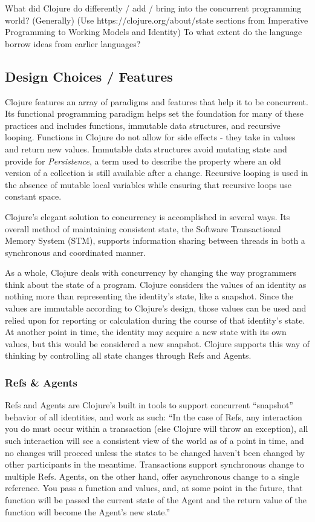     What did Clojure do differently / add / bring into the concurrent programming world? (Generally)
        (Use https://clojure.org/about/state sections from Imperative Programming to Working Models and Identity)
    To what extent do the language borrow ideas from earlier languages?
    
\subsection{Design Choices / Features}
    
   Clojure features an array of paradigms and features that help it to be concurrent. Its functional programming paradigm helps set the foundation for many of these practices and includes functions, immutable data structures, and recursive looping. Functions in Clojure do not allow for side effects - they take in values and return new values. Immutable data structures avoid mutating state and provide for \textit{Persistence}, a term used to describe the property where an old version of a collection is still available after a change. Recursive looping is used in the absence of mutable local variables while ensuring that recursive loops use constant space.
    
    Clojure's elegant solution to concurrency is accomplished in several ways. Its overall method of maintaining consistent state, the Software Transactional Memory System (STM), supports information sharing between threads in both  a synchronous and coordinated manner.
    
    As a whole, Clojure deals with concurrency by changing the way programmers think about the state of a program. Clojure considers the values of an identity as nothing more than representing the identity's state, like a snapshot. Since the values are immutable according to Clojure's design, those values can be used and relied upon for reporting or calculation during the course of that identity's state. At another point in time, the identity may acquire a new state with its own values, but this would be considered a new snapshot. Clojure supports this way of thinking by controlling all state changes through Refs and Agents.

\subsubsection{Refs \& Agents}

    Refs and Agents are Clojure's built in tools to support concurrent ``snapshot'' behavior of all identities, and work as such: ``In the case of Refs, any interaction you do must occur within a transaction (else Clojure will throw an exception), all such interaction will see a consistent view of the world as of a point in time, and no changes will proceed unless the states to be changed haven’t been changed by other participants in the meantime. Transactions support synchronous change to multiple Refs. Agents, on the other hand, offer asynchronous change to a single reference. You pass a function and values, and, at some point in the future, that function will be passed the current state of the Agent and the return value of the function will become the Agent’s new state.'' \cite{website:clojure-concurrency}
    
